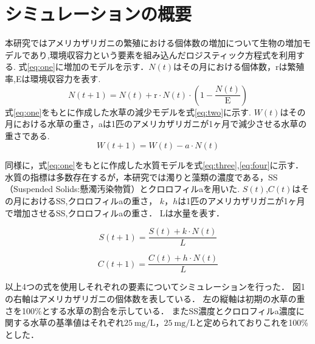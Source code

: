 \documentclass[twocolumn,10pt,a4j]{ltjsarticle}
\begin{document}

\section{シミュレーションの概要}
本研究ではアメリカザリガニの繁殖における個体数の増加について生物の増加モデルであり,環境収容力という要素を組み込んだロジスティック方程式を利用する\cite{log}.
式\eqref{eq:one}に増加のモデルを示す．$N(t)は$その月における個体数，rは繁殖率,Eは環境収容力を表す.
\begin{equation}
  N(t+1) = N(t) + \mathrm{r} \cdot N(t) \cdot \left(1 - \frac{N(t)}{\mathrm{E}}\right)\label{eq:one}
\end{equation}
式\eqref{eq:one}をもとに作成した水草の減少モデルを式\eqref{eq:two}に示す.
$W(t)$はその月における水草の重さ，aは1匹のアメリカザリガニが1ヶ月で減少させる水草の重さである.
\begin{equation}
  W(t+1) = W(t) - a \cdot N(t)\label{eq:two}
\end{equation}

同様に，式\eqref{eq:one}をもとに作成した水質モデルを式\eqref{eq:three},\eqref{eq:four}に示す．
水質の指標は多数存在するが，本研究では濁りと藻類の濃度である，SS（Suspended Solids:懸濁汚染物質）とクロロフィルaを用いた.
$S(t)$,$C(t)$はその月におけるSS,クロロフィルaの重さ，
$k$，$h$は1匹のアメリカザリガニが1ヶ月で増加させるSS,クロロフィルaの重さ．
Lは水量を表す．

\begin{equation}
  S(t+1) = \frac{S(t) + k \cdot N(t)}{L}\label{eq:three}
\end{equation}

\begin{equation}
  C(t+1) = \frac{C(t) + h \cdot N(t)}{L}\label{eq:four}
\end{equation}


以上4つの式を使用しそれぞれの要素についてシミュレーションを行った．
図1の右軸はアメリカザリガニの個体数を表している．
左の縦軸は初期の水草の重さを100\%とする水草の割合を示している．
またSS濃度とクロロフィルa濃度に関する水草の基準値はそれぞれ$25\ \text{mg}/\text{L}$，$25\ \text{mg}/\text{L}$と定められておりこれを100\%とした．
\end{document}
